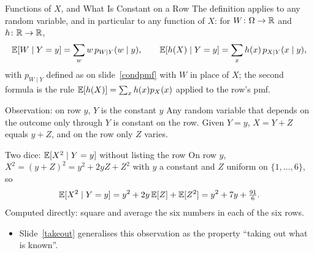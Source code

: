\begin{frame}{Functions of $X$, and What Is Constant on a Row}
  \small
  \label{constrow}%
  The definition applies to any random variable, and in particular to any function of $X$: for $W\colon\Omega\to\mathbb{R}$ and $h\colon\mathbb{R}\to\mathbb{R}$,
  \[
    \mathbb{E}[W\mid Y=y]=\sum_w w\,p_{W\mid Y}(w\mid y),\qquad
    \mathbb{E}[h(X)\mid Y=y]=\sum_x h(x)\,p_{X\mid Y}(x\mid y),
  \]
  with $p_{W\mid Y}$ defined as on slide~\ref{condpmf} with $W$ in place of $X$; the second formula is the rule $\mathbb{E}[h(X)]=\sum_x h(x)p_X(x)$ applied to the row's pmf.
  \begin{block}{Observation: on row $y$, $Y$ is the constant $y$}
    Any random variable that depends on the outcome only through $Y$ is constant on the row. Given $Y=y$, $X=Y+Z$ equals $y+Z$, and on the row only $Z$ varies.
  \end{block}
  \begin{exampleblock}{Two dice: $\mathbb{E}[X^2\mid Y=y]$ without listing the row}
    On row $y$, $X^2=(y+Z)^2=y^2+2yZ+Z^2$ with $y$ a constant and $Z$ uniform on $\{1,\dots,6\}$, so
    \[
      \mathbb{E}[X^2\mid Y=y]=y^2+2y\,\mathbb{E}[Z]+\mathbb{E}[Z^2]=y^2+7y+\tfrac{91}{6} .
    \]
    Computed directly: square and average the six numbers in each of the six rows.
  \end{exampleblock}
  \begin{itemize}
    \item Slide~\ref{takeout} generalises this observation as the property ``taking out what is known''.
  \end{itemize}
\end{frame}

